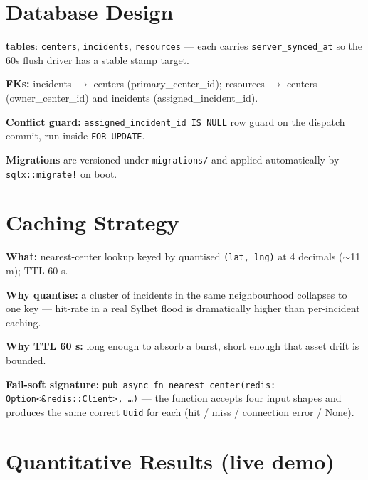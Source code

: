 \documentclass[10pt,letterpaper]{article}
\begin{document}
\section{Database Design}
\begin{tightemize}
    \item \textbf{tables}: \texttt{centers}, \texttt{incidents}, \texttt{resources} --- each carries \texttt{server\_synced\_at} so the 60s flush driver has a stable stamp target.
    \item \textbf{FKs:} incidents $\rightarrow$ centers (primary\_center\_id); resources $\rightarrow$ centers (owner\_center\_id) and incidents (assigned\_incident\_id).
    \item \textbf{Conflict guard:} \texttt{assigned\_incident\_id IS NULL} row guard on the dispatch commit, run inside \texttt{FOR UPDATE}.
    \item \textbf{Migrations} are versioned under \texttt{migrations/} and applied automatically by \texttt{sqlx::migrate!} on boot.
\end{tightemize}

\section{Caching Strategy}
\begin{tightemize}
    \item \textbf{What:} nearest-center lookup keyed by quantised \texttt{(lat, lng)} at 4 decimals ($\sim$11 m); TTL 60 s.
    \item \textbf{Why quantise:} a cluster of incidents in the same neighbourhood collapses to one key --- hit-rate in a real Sylhet flood is dramatically higher than per-incident caching.
    \item \textbf{Why TTL 60 s:} long enough to absorb a burst, short enough that asset drift is bounded.
    \item \textbf{Fail-soft signature:} \texttt{pub async fn nearest\_center(redis: Option<\&redis::Client>, \ldots)} --- the function accepts four input shapes and produces the same correct \texttt{Uuid} for each (hit / miss / connection error / None).
\end{tightemize}

\section{Quantitative Results (live demo)}
\end{document}
